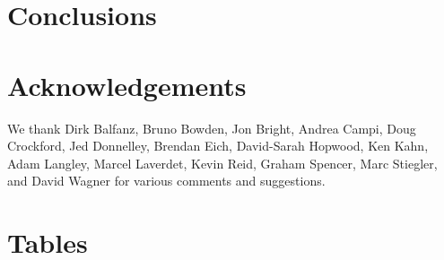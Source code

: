 \documentclass[letterpaper,twocolumn,10pt]{article}
\begin{document}

\section{Conclusions}


\section{Acknowledgements}

We thank 
Dirk Balfanz,
Bruno Bowden,
Jon Bright,
Andrea Campi,
Doug Crockford,
Jed Donnelley,
Brendan Eich,
David-Sarah Hopwood,
Ken Kahn,
Adam Langley,
Marcel Laverdet,
Kevin Reid,
Graham Spencer,
Marc Stiegler,
and
David Wagner
for various comments and suggestions.

\appendix

\section{Tables}
\end{document}
